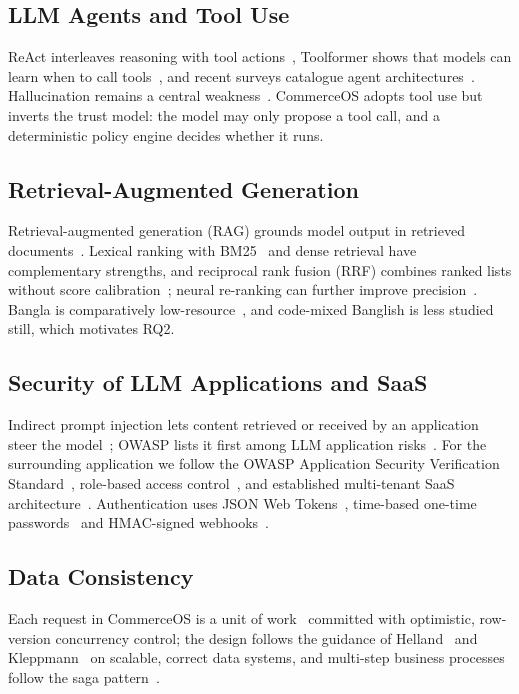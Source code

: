 \documentclass[conference,a4paper]{IEEEtran}
\begin{document}
\subsection{LLM Agents and Tool Use}
ReAct interleaves reasoning with tool actions~\cite{yao}, Toolformer shows that models can learn when to call tools~\cite{schick}, and recent surveys catalogue agent architectures~\cite{wang}. Hallucination remains a central weakness~\cite{ji}. CommerceOS adopts tool use but inverts the trust model: the model may only propose a tool call, and a deterministic policy engine decides whether it runs.

\subsection{Retrieval-Augmented Generation}
Retrieval-augmented generation (RAG) grounds model output in retrieved documents~\cite{lewis,gao}. Lexical ranking with BM25~\cite{robertson} and dense retrieval have complementary strengths, and reciprocal rank fusion (RRF) combines ranked lists without score calibration~\cite{cormack}; neural re-ranking can further improve precision~\cite{nogueira}. Bangla is comparatively low-resource~\cite{bhattacharjee}, and code-mixed Banglish is less studied still, which motivates RQ2.

\subsection{Security of LLM Applications and SaaS}
Indirect prompt injection lets content retrieved or received by an application steer the model~\cite{greshake}; OWASP lists it first among LLM application risks~\cite{owaspllm}. For the surrounding application we follow the OWASP Application Security Verification Standard~\cite{asvs}, role-based access control~\cite{sandhu}, and established multi-tenant SaaS architecture~\cite{chong,guo}. Authentication uses JSON Web Tokens~\cite{jwt}, time-based one-time passwords~\cite{totp} and HMAC-signed webhooks~\cite{hmac}.

\subsection{Data Consistency}
Each request in CommerceOS is a unit of work~\cite{fowler} committed with optimistic, row-version concurrency control; the design follows the guidance of Helland~\cite{helland} and Kleppmann~\cite{kleppmann} on scalable, correct data systems, and multi-step business processes follow the saga pattern~\cite{garcia}.
\end{document}
